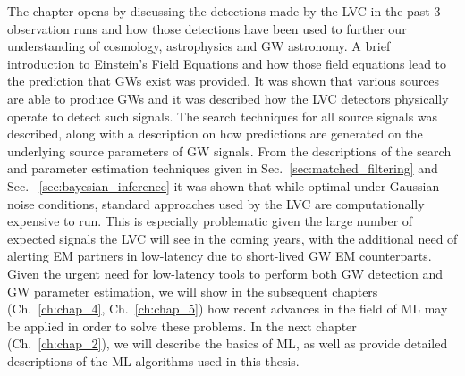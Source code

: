 The chapter opens 
by discussing the detections made by the \ac{LVC} in the past 3 
observation runs and how those detections have been used to 
further our understanding of cosmology, astrophysics and \ac{GW} astronomy.
A brief introduction to Einstein's Field Equations and how those field equations lead to the prediction that \ac{GW}s exist was provided. It was 
shown that various sources are able to produce \ac{GW}s and it was described 
how the \ac{LVC} detectors physically operate to detect such signals. The 
search techniques for all source signals was described, along with a 
description on how predictions are generated on the 
underlying source parameters of \ac{GW} signals. From the descriptions 
of the search and parameter estimation techniques given in Sec.~\ref{sec:matched_filtering} and Sec.
~\ref{sec:bayesian_inference} it was shown that while optimal under Gaussian-noise conditions, standard 
approaches used by the \ac{LVC} are computationally expensive to 
run. This is especially problematic given the large number of 
expected signals the \ac{LVC} will see in the coming years, with 
the additional need of alerting \ac{EM} partners in low-latency due 
to short-lived \ac{GW} \ac{EM} counterparts. Given the urgent need 
for low-latency tools to perform both \ac{GW} detection and \ac{GW} 
parameter estimation, we will show in the subsequent chapters (Ch.~\ref{ch:chap_4}, Ch.~\ref{ch:chap_5}) how recent advances in  
the field of \ac{ML} may be applied in order to solve these problems. 
In the next chapter (Ch.~\ref{ch:chap_2}), we will describe the basics 
of \ac{ML}, as well as provide detailed descriptions of 
the \ac{ML} algorithms used in this thesis.